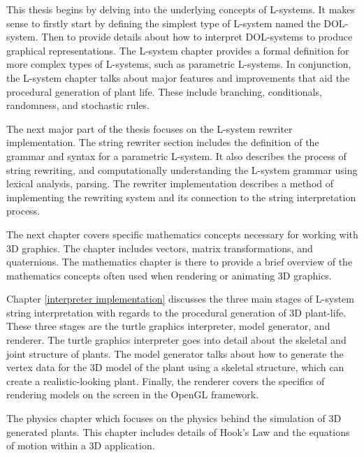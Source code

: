 This thesis begins by delving into the underlying concepts of L-systems. It makes sense to firstly start by defining the simplest type of L-system named the DOL-system. Then to provide details about how to interpret DOL-systems to produce graphical representations. The L-system chapter provides a formal definition for more complex types of L-systems, such as parametric L-systems. In conjunction, the L-system chapter talks about major features and improvements that aid the procedural generation of plant life. These include branching, conditionals, randomness, and stochastic rules.

The next major part of the thesis focuses on the L-system rewriter implementation. The string rewriter section includes the definition of the grammar and syntax for a parametric L-system. It also describes the process of string rewriting, and computationally understanding the L-system grammar using lexical analysis, parsing. The rewriter implementation describes a method of implementing the rewriting system and its connection to the string interpretation process.

The next chapter covers specific mathematics concepts necessary for working with 3D graphics. The chapter includes vectors, matrix transformations, and quaternions. The mathematics chapter is there to provide a brief overview of the mathematics concepts often used when rendering or animating 3D graphics.  

Chapter \ref{interpreter implementation} discusses the three main stages of L-system string interpretation with regards to the procedural generation of 3D plant-life. These three stages are the turtle graphics interpreter, model generator, and renderer. The turtle graphics interpreter goes into detail about the skeletal and joint structure of plants. The model generator talks about how to generate the vertex data for the 3D model of the plant using a skeletal structure, which can create a realistic-looking plant. Finally, the renderer covers the specifics of rendering models on the screen in the OpenGL framework.

The physics chapter which focuses on the physics behind the simulation of 3D generated plants. This chapter includes details of Hook's Law and the equations of motion within a 3D application.



